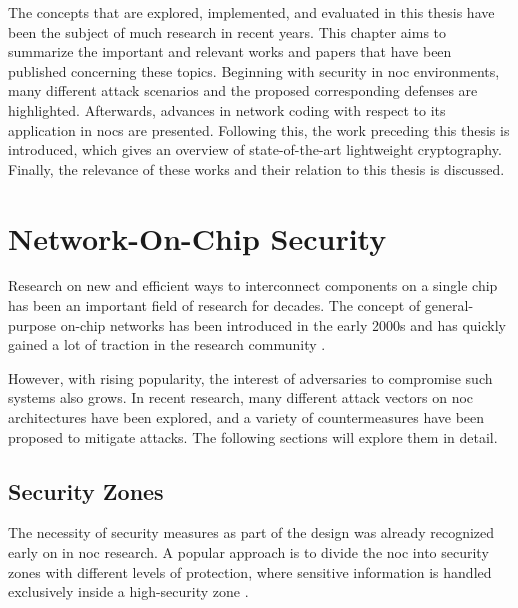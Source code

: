 The concepts that are explored, implemented, and evaluated in this thesis have been the subject of much research in recent years. This chapter aims to
summarize the important and relevant works and papers that have been published concerning these topics. Beginning with security in \gls{noc}
environments, many different attack scenarios and the proposed corresponding defenses are highlighted. Afterwards, advances in network coding with
respect to its application in \glspl{noc} are presented. Following this, the work preceding this thesis is introduced, which gives an overview of
state-of-the-art lightweight cryptography. Finally, the relevance of these works and their relation to this thesis is discussed.

\section{Network-On-Chip Security}\label{sec:nocsecurity}
Research on new and efficient ways to interconnect components on a single chip has been an important field of research for decades. The concept of
general-purpose on-chip networks has been introduced in the early 2000s
\cites{dally01routepacketsnotwires}{kumar02networkonchip}{benini02nocparadigm} and has quickly gained a lot of traction in the research community
\cite[e.g.][]{ivanov05nocintroduction}. 

However, with rising popularity, the interest of adversaries to compromise such systems also grows. In recent research, many different attack vectors
on \gls{noc} architectures have been explored, and a variety of countermeasures have been proposed to mitigate attacks. The following sections will
explore them in detail.

\subsection{Security Zones}\label{subsec:securityzones}
The necessity of security measures as part of the design was already recognized early on in \gls{noc} research. A popular approach is to
divide the \gls{noc} into security zones with different levels of protection, where sensitive information is handled exclusively inside a
high-security zone \cites(e.g.)(){gebotys03securityframework}{fernandes16nocrouting}{kapoor13nocauthenc}.

